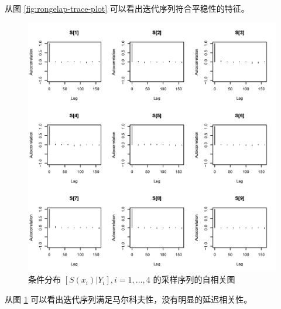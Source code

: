 \documentclass[12pt,a4paper,UTF8,twoside]{book}
\theoremstyle{definition}
\theoremstyle{definition}
\theoremstyle{definition}
\theoremstyle{remark}
\begin{document}
从图 \ref{fig:rongelap-trace-plot} 可以看出迭代序列符合平稳性的特征。

\begin{figure}

{\centering \includegraphics[width=0.7\linewidth]{figures/rongelap-mcml-diagnosis-acf-9} 

}

\caption{条件分布 \([S(x_{i})|Y_{i}], i = 1, \ldots, 4\)
的采样序列的自相关图}\label{fig:rongelap-acf-plot}
\end{figure}

从图 \ref{fig:rongelap-acf-plot}
可以看出迭代序列满足马尔科夫性，没有明显的延迟相关性。
\end{document}
